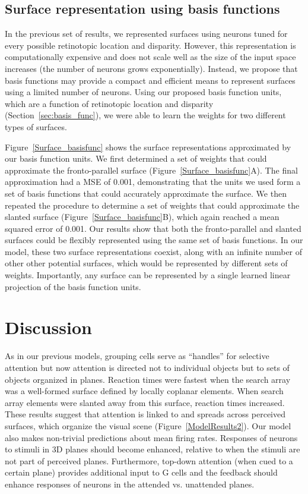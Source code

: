 \subsection{Surface representation using basis functions}

In the previous set of results, we represented surfaces using neurons tuned for every possible retinotopic location and disparity. However, this representation is computationally expensive and does not scale well as the size of the input space increases (\ie the number of neurons grows exponentially). Instead, we propose that basis functions may provide a compact and efficient means to represent surfaces using a limited number of neurons. Using our proposed basis function units, which are a function of retinotopic location and disparity (Section~\ref{sec:basis_func}), we were able to learn the weights for two different types of surfaces. 

Figure~\ref{Surface_basisfunc} shows the surface representations approximated by our basis function units. We first determined a set of weights that could approximate the fronto-parallel surface (Figure~\ref{Surface_basisfunc}A). The final approximation had a MSE of 0.001, demonstrating that the units we used form a set of basis functions that could accurately approximate the surface. We then repeated the procedure to determine a set of weights that could approximate the slanted surface (Figure~\ref{Surface_basisfunc}B), which again reached a mean squared error of 0.001. Our results show that both the fronto-parallel and slanted surfaces could be flexibly represented using the same set of basis functions. In our model, these two surface representations coexist, along with an infinite number of other other potential surfaces, which would be represented by different sets of weights. Importantly, any surface can be represented by a single learned linear projection of the basis function units.

\section{Discussion}

As in our previous models, grouping cells serve as ``handles'' for selective attention but now attention is directed not to individual objects but to sets of objects organized in planes. Reaction times were fastest when the search array was a well-formed surface defined by locally coplanar elements. When search array elements were slanted away from this surface, reaction times increased. These results suggest that attention is linked to and spreads across perceived surfaces, which organize the visual scene
(Figure~\ref{ModelResults2}). Our model also makes non-trivial predictions about mean firing rates. Responses of neurons to stimuli in 3D planes should become enhanced, relative to when the stimuli are not part of perceived planes. Furthermore, top-down attention (when cued to a certain plane) provides additional input to G cells and the feedback should enhance responses of neurons in the attended vs. unattended planes.


